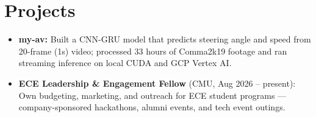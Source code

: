 \documentclass[11pt, letterpaper]{article}
\begin{document}
\section{Projects}
\begin{itemize}
  \item \textbf{my-av:} Built a CNN-GRU model that predicts steering angle and speed from 20-frame (1s) video; processed 33 hours of Comma2k19 footage and ran streaming inference on local CUDA and GCP Vertex AI.
  \item \textbf{ECE Leadership \& Engagement Fellow} (CMU, Aug 2026 -- present): Own budgeting, marketing, and outreach for ECE student programs --- company-sponsored hackathons, alumni events, and tech event outings.
\end{itemize}
\end{document}
